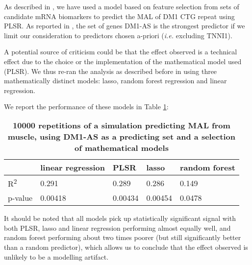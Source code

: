 \documentclass[10pt,letterpaper]{article}
\begin{document}
As described in , we have used a model based on feature selection from sets of candidate mRNA biomarkers to predict the MAL of DM1 CTG repeat using PLSR. As reported in , the set of genes DM1-AS is the strongest predictor if we limit our consideration to predictors chosen a-priori ({\it i.e.} excluding TNNI1).

A potential source of criticism could be that the effect observed is a technical effect due to the choice or the implementation of the mathematical model used (PLSR). We thus re-ran the analysis as described before in  using three mathematically distinct models: lasso, random forest regression and linear regression.

We report the performance of these models in Table \ref{model_comparison}:

\begin{table}[!ht]
\begin{adjustwidth}{-2.25in}{0in} %
\centering
\caption{{\bf 10000 repetitions of a simulation predicting MAL from muscle, using DM1-AS as a predicting set and a selection of mathematical models}}

\begin{tabular}{|l|l|l|l|l|}
\hline
 & linear regression & PLSR & lasso & random forest \\ \hline
R\textsuperscript{2} & 0.291 & 0.289 & 0.286 & 0.149 \\ \hline
p-value & 0.00418 & 0.00434 & 0.00454 & 0.0478 \\ \hline
\end{tabular}

\label{model_comparison}
\end{adjustwidth}
\end{table}


It should be noted that all models pick up statistically significant signal with both PLSR, lasso and linear regression performing almost equally well, and random forest performing about two times poorer (but still significantly better than a random predictor), which allows us to conclude that the effect observed is unlikely to be a modelling artifact.

\end{document}

